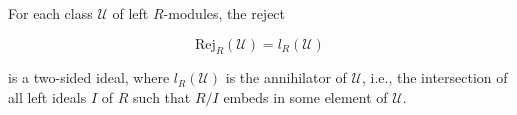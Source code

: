 For each class $\mathcal{U}$ of left $R$-modules, the reject

$$\mathrm{Rej}_R(\mathcal{U}) = l_R(\mathcal{U})$$

is a two-sided ideal, where $l_R(\mathcal{U})$ is the annihilator of $\mathcal{U}$, i.e., the intersection of all left ideals $I$ of $R$ such that $R/I$ embeds in some element of $\mathcal{U}$.

